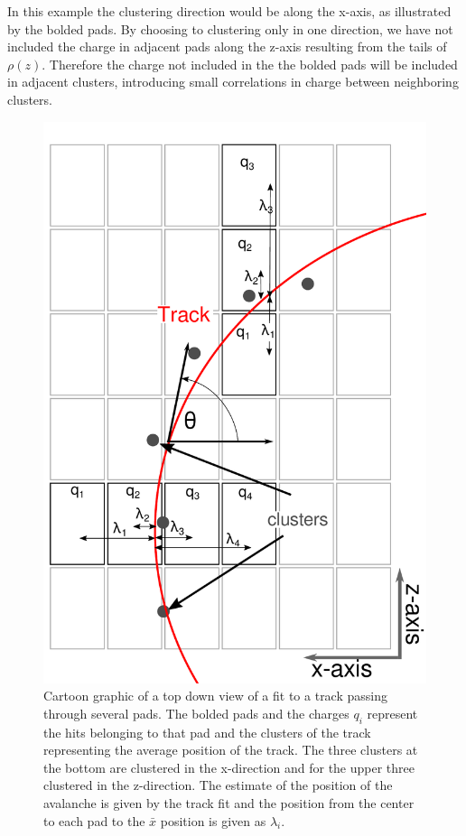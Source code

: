 \documentclass[review]{elsarticle}
\begin{document}
In this example the clustering direction would be along the x-axis, as illustrated by the bolded pads. By choosing to clustering only in one direction, we have not included the charge in adjacent pads along the z-axis resulting from the tails of $\rho(z)$. Therefore the charge not included in the the bolded pads will be included in adjacent clusters, introducing small correlations in charge between neighboring clusters. 

\begin{figure}[H]
\includegraphics[scale=.5]{top_view_helix_ext.pdf}
\caption{Cartoon graphic of a top down view of a fit to a track passing through several pads. The bolded pads and the charges $q_i$ represent the hits belonging to that pad and the clusters of the track representing the average position of the track. The three clusters at the bottom are clustered in the x-direction and for the upper three clustered in the z-direction. The estimate of the position of the avalanche is given by the track fit and the position from the center to each pad to the $\bar{x}$ position is given as $\lambda_i$.}
\label{fig:topview}
\end{figure}
\end{document}
